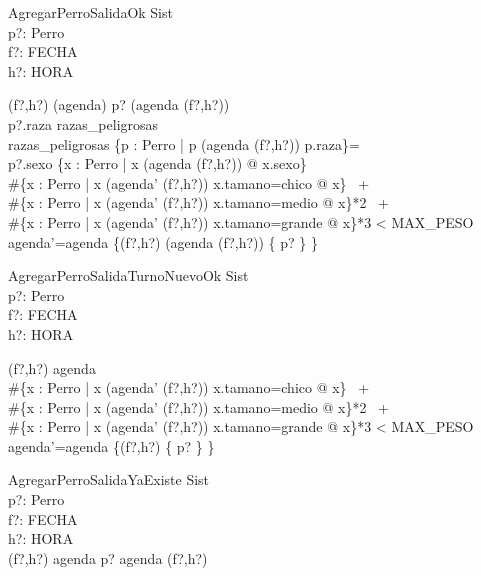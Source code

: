 \documentclass[12pt,zed]{article}
\begin{document}
\begin{schema}{AgregarPerroSalidaOk}
\Delta Sist \\
p?: Perro \\
f?: FECHA \\
h?: HORA \\
\where

(f?,h?) \in (\dom agenda) \land p? \notin (agenda (f?,h?)) \\
p?.raza \notin razas\_peligrosas \lor \\ razas\_peligrosas \cap \{p : Perro | p \in (agenda (f?,h?)) \spot p.raza\}=\emptyset \\
p?.sexo \in \{x : Perro | x \in (agenda (f?,h?)) @ x.sexo\}\\
\#\{x : Perro | x \in (agenda' (f?,h?)) \land x.tamano=chico @ x\} \ + \\
\#\{x : Perro | x \in (agenda' (f?,h?)) \land  x.tamano=medio @ x\}*2 \ + \\
\#\{x : Perro | x \in (agenda' (f?,h?)) \land  x.tamano=grande @ x\}*3 < MAX\_PESO \\
agenda'=agenda \oplus \{(f?,h?) \mapsto (agenda (f?,h?)) \cup \{ p? \} \}  \\

\end{schema}


\begin{schema}{AgregarPerroSalidaTurnoNuevoOk}
\Delta Sist \\
p?: Perro \\
f?: FECHA \\
h?: HORA \\
\where

(f?,h?) \notin \dom agenda \\





\#\{x : Perro | x \in (agenda' (f?,h?)) \land x.tamano=chico @ x\} \ + \\
\#\{x : Perro | x \in (agenda' (f?,h?)) \land  x.tamano=medio @ x\}*2 \ + \\
\#\{x : Perro | x \in (agenda' (f?,h?)) \land  x.tamano=grande @ x\}*3 < MAX\_PESO \\
agenda'=agenda \oplus \{(f?,h?) \mapsto \{ p? \} \} \\

\end{schema}

\begin{schema}{AgregarPerroSalidaYaExiste}
\Xi Sist \\
p?: Perro \\
f?: FECHA \\
h?: HORA \\
\where
(f?,h?) \in \dom agenda \land p? \in agenda (f?,h?) \\
\end{schema}
\end{document}
